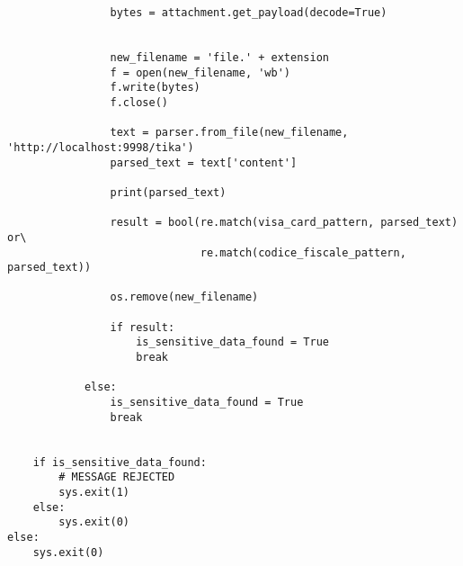 \begin{verbatim}
                bytes = attachment.get_payload(decode=True)
                

                new_filename = 'file.' + extension
                f = open(new_filename, 'wb')
                f.write(bytes)
                f.close()

                text = parser.from_file(new_filename, 'http://localhost:9998/tika')
                parsed_text = text['content']

                print(parsed_text)

                result = bool(re.match(visa_card_pattern, parsed_text) or\
                              re.match(codice_fiscale_pattern, parsed_text))

                os.remove(new_filename)

                if result:
                    is_sensitive_data_found = True
                    break

            else:  
                is_sensitive_data_found = True
                break


    if is_sensitive_data_found:
        # MESSAGE REJECTED
        sys.exit(1)
    else:
        sys.exit(0)
else:
    sys.exit(0)
\end{verbatim}